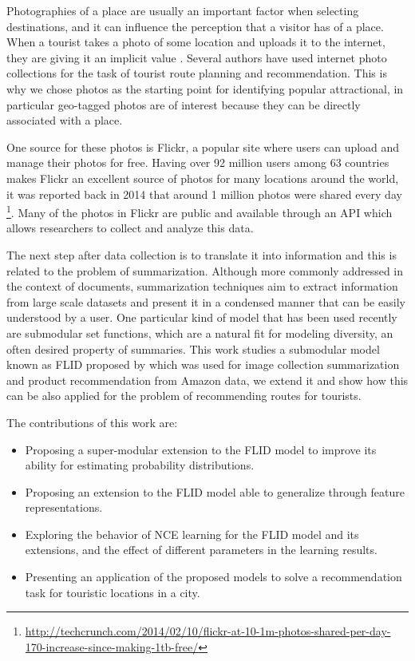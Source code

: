 Photographies of a place are usually an important factor when selecting destinations, and it can influence the perception that a visitor has of a place. When a tourist takes a photo of some location and uploads it to the internet, they are giving it an implicit value  \citep{Donaire2014}. Several authors have used internet photo collections for the task of tourist route planning and recommendation. This is why we chose photos as the starting point for identifying popular attractional, in particular geo-tagged photos are of interest because they can be directly associated with a place.

One source for these photos is Flickr, a popular site where users can upload and manage their photos for free. Having over 92 million users among 63 countries makes Flickr an excellent source of photos for many locations around the world, it was reported back in 2014 that around 1 million photos were shared every day \footnote{\url{http://techcrunch.com/2014/02/10/flickr-at-10-1m-photos-shared-per-day-170-increase-since-making-1tb-free/}}. Many of the photos in Flickr are public and available through an API which allows researchers to collect and analyze this data.

The next step after data collection is to translate it into information and this is related to the problem of summarization. Although more commonly addressed in the context of documents, summarization techniques aim to extract information from large scale datasets and present it in a condensed manner that can be easily understood by a user. One particular kind of model that has been used recently are submodular set functions, which are a natural fit for modeling diversity, an often desired property of summaries. This work studies a submodular model known as FLID proposed by \citet{tschiatschek16learning} which was used for image collection summarization and product recommendation from Amazon data, we extend it and show how this can be also applied for the problem of recommending routes for tourists.

The contributions of this work are:

\begin{itemize}
  \item Proposing a super-modular extension to the FLID model to improve its ability for estimating probability distributions.
  \item Proposing an extension to the FLID model able to generalize through feature representations.
  \item Exploring the behavior of NCE learning for the FLID model and its extensions, and the effect of different parameters in the learning results.
  \item Presenting an application of the proposed models to solve a recommendation task for touristic locations in a city.
\end{itemize}

